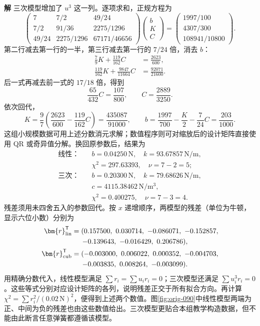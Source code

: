 \documentclass[11pt,openany,fontset=fandol]{ctexbook}
\theoremstyle{plain}\newtheorem{theorem}{定理}[chapter]\newtheorem{proposition}[theorem]{命题}
\theoremstyle{definition}\newtheorem{definition}{定义}[chapter]\newtheorem{example}{例}[chapter]
\theoremstyle{remark}\newtheorem*{remark}{说明}
\newcommand{\SolutionStart}{\par\nobreak\medskip\nobreak\noindent\textbf{解}\quad\ignorespaces}
\newenvironment{solution}{\SolutionStart}{\par\medskip}
\newcommand{\vct}[1]{\bm{#1}}\newcommand{\Rea}{\operatorname{Re}}\newcommand{\Ima}{\operatorname{Im}}
\begin{document}
\begin{enumerate}[label=4.\arabic*,itemsep=3pt]
\begin{solution}
三次模型增加了 $u^3$ 这一列。逐项求和，正规方程为
\[
\begin{pmatrix}
7&7/2&49/24\\
7/2&91/36&2275/1296\\
49/24&2275/1296&67171/46656
\end{pmatrix}
\begin{pmatrix}b\\K\\C\end{pmatrix}
=\begin{pmatrix}1997/100\\4307/300\\108941/10800\end{pmatrix}.
\]
第二行减去第一行的一半，第三行减去第一行的 $7/24$ 倍，消去 $b$：
\[
\begin{aligned}
\frac79K+\frac{119}{162}C&=\frac{2623}{600},\\
\frac{119}{162}K+\frac{9847}{11664}C&=\frac{92071}{21600}.
\end{aligned}
\]
后一式再减去前一式的 $17/18$ 倍，得到
\[
\frac{65}{432}C=\frac{107}{800},\qquad C=\frac{2889}{3250}.
\]
依次回代，
\[
K=\frac97\left(\frac{2623}{600}-\frac{119}{162}C\right)
=\frac{435087}{91000},
\qquad
b=\frac{1997}{700}-\frac K2-\frac7{24}C=\frac{203}{1000}.
\]
这组小规模数据可用上述分数消元求解；数值程序则可对缩放后的设计矩阵直接使用 QR 或奇异值分解。换回原参数后，结果为
\begin{align*}
\text{线性：}\quad &b=0.04250\,\mathrm N,\quad k=93.67857\,\mathrm{N/m},\\
&\chi^2=297.63393,\quad \nu=7-2=5;\\
\text{三次：}\quad &b=0.20300\,\mathrm N,\quad k=79.68626\,\mathrm{N/m},\\
&c=4115.38462\,\mathrm{N/m^3},\\
&\chi^2=0.400275,\quad \nu=7-3=4.
\end{align*}
残差须用未四舍五入的参数回代。按 $x$ 递增顺序，两模型的残差（单位为牛顿，显示六位小数）分别为
\[
\begin{aligned}
\vct r_{\rm lin}^{\mathsf T}
&=(0.157500,\ 0.030714,\ {-0.086071},\ {-0.152857},\\
&\hspace{1.5em}{-0.139643},\ {-0.016429},\ 0.206786),\\
\vct r_{\rm cub}^{\mathsf T}
&=({-0.003000},\ 0.006022,\ 0.000352,\ {-0.004703},\\
&\hspace{1.5em}{-0.003835},\ 0.008264,\ {-0.003099}).
\end{aligned}
\]
用精确分数代入，线性模型满足 $\sum r_i=\sum u_ir_i=0$；三次模型还满足 $\sum u_i^3r_i=0$。这些等式分别对应设计矩阵的各列，说明残差正交于所有拟合方向。再计算 $\chi^2=\sum r_i^2/(0.02\,\mathrm N)^2$，便得到上述两个数值。图\ref{fig:orig-090}中线性模型两端为正、中间为负的残差也由这些数值给出。三次模型更贴合本组教学构造数据，但不能由此断言任意弹簧都遵循该模型。


\end{solution}
\end{enumerate}
\end{document}
